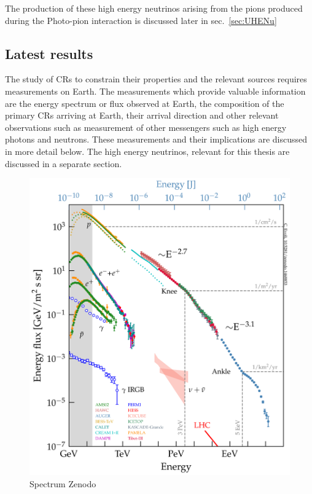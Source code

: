 The production of these high energy neutrinos arising from the pions produced during the Photo-pion interaction is discussed later in sec.~\ref{sec:UHENu} 

\subsection{Latest results}
\label{subsec:CRresults}
The study of CRs to constrain their properties and the relevant sources requires measurements on Earth. The measurements which provide valuable information are the energy spectrum or flux observed at Earth, the composition of the primary CRs arriving at Earth, their arrival direction and other relevant observations such as measurement of other messengers such as high energy photons and neutrons. These measurements and their implications are discussed in more detail below. The high energy neutrinos, relevant for this thesis are discussed in a separate section. 

\begin{figure}[t!]
  \centering
  \includegraphics[width=14.5cm]{thesis_figures/CRnNu/all_particle_spectrum.png}
  \caption{Spectrum Zenodo~\cite{evoli_2018_2360277}}
  \label{fig:CR-spectrum}
\end{figure}
